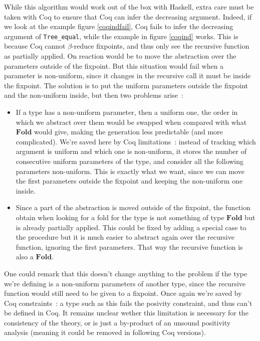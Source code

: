 \documentclass{article}
\newcommand{\fld}{\mathbf{Fold}}
\begin{document}
While this algorithm would work out of the box with Haskell, extra care must be
taken with Coq to ensure that Coq can infer the decreasing argument. Indeed, if
we look at the example figure \ref{coqindfail}, Coq fails to infer the decreasing
argument of \texttt{Tree\_equal}, while the example in figure \ref{coqind}
works. This is because Coq cannot $\beta$-reduce fixpoints, and thus only
see the recursive function as partially applied. On reaction would be to move
the abstraction over the parameters outside of the fixpoint. But this situation
would fail when a parameter is non-uniform, since it changes in the recursive
call it must be inside the fixpoint. The solution is to put the uniform
parameters outside the fixpoint and the non-uniform inside, but then two
problems arise~:\begin{itemize}
    \item If a type has a non-uniform parameter, then a uniform one, the order
        in which we abstract over them would be swapped when compared with
        what $\fld$ would give, making the generation less predictable (and
        more complicated). We're saved here by Coq limitations~: instead of
        tracking which argument is uniform and which one is non-uniform, it stores
        the number of consecutive uniform parameters of the type, and consider
        all the following parameters non-uniform. This is exactly what we want,
        since we can move the first parameters outside the fixpoint and keeping
        the non-uniform one inside.
    \item Since a part of the abstraction is moved outside of the fixpoint,
        the function obtain when looking for a fold for the type is not something
        of type $\fld$ but is already partially applied. This could be fixed
        by adding a special case to the procedure but it is much easier to
        abstract again over the recursive function, ignoring the first
        parameters. That way the recursive function is also a $\fld$.
\end{itemize}

One could remark that this doesn't change anything to the problem if the type
we're defining is a non-uniform parameters of another type, since the recursive
function would still need to be given to a fixpoint. Once again we're saved by
Coq constraints~: a type such as this fails the posivity constraint, and thus
can't be defined in Coq. It remains unclear wether this limitation is necessary
for the consistency of the theory, or is just a by-product of an unsound
positivity analysis (meaning it could be removed in following Coq versions).
\end{document}
